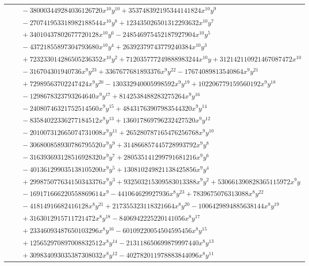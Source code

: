 \documentclass[11pt]{article}
\begin{document}
\begin{longtable}{@{}ll@{}}
 & $\quad -380003449284036126720x^{10}y^{10}+353748392195344141824x^{10}y^{9}$\\
 & $\quad -270741953318982188544x^{10}y^{8}+123435026501312293632x^{10}y^{7}$\\
 & $\quad +34010437802677720128x^{10}y^{6}-248546975452187927904x^{10}y^{5}$\\
 & $\quad -43721855897304793680x^{10}y^{4}+26392379743779240384x^{10}y^{3}$\\
 & $\quad +723233014286505236352x^{10}y^{2}+712035777249888983244x^{10}y+312142110921467087472x^{10}$\\
 & $\quad -316704301940736x^{9}y^{23}+3367677681893376x^{9}y^{22}-17674089813540864x^{9}y^{21}$\\
 & $\quad +72989563702247424x^{9}y^{20}-130332940005998592x^{9}y^{19}+102206779159560192x^{9}y^{18}$\\
 & $\quad -1298678323793264640x^{9}y^{17}+8142538488283275264x^{9}y^{16}$\\
 & $\quad -24080746321752514560x^{9}y^{15}+48431763907983544320x^{9}y^{14}$\\
 & $\quad -83584022336277184512x^{9}y^{13}+136017869796232427520x^{9}y^{12}$\\
 & $\quad -201007312665074731008x^{9}y^{11}+265280787165476256768x^{9}y^{10}$\\
 & $\quad -306800858930786795520x^{9}y^{9}+314866857445728993792x^{9}y^{8}$\\
 & $\quad -316393693128516928320x^{9}y^{7}+280535141299791681216x^{9}y^{6}$\\
 & $\quad -401361299035138105200x^{9}y^{5}+130810249821138425856x^{9}y^{4}$\\
 & $\quad +299875077634150343376x^{9}y^{3}+932503215309583013388x^{9}y^{2}+530661390828365115972x^{9}y$\\
 & $\quad -169171666220558869614x^{9}-441064629927936x^{8}y^{23}+7839675076313088x^{8}y^{22}$\\
 & $\quad -41814916682416128x^{8}y^{21}+217355323118321664x^{8}y^{20}-1006429894885638144x^{8}y^{19}$\\
 & $\quad +3163012915711721472x^{8}y^{18}-8406942225220141056x^{8}y^{17}$\\
 & $\quad +23346093487650103296x^{8}y^{16}-60109220054504595456x^{8}y^{15}$\\
 & $\quad +125652970897008832512x^{8}y^{14}-213118650699879997440x^{8}y^{13}$\\
 & $\quad +309834093035387308032x^{8}y^{12}-402782011978883844096x^{8}y^{11}$\\

\end{longtable}
\end{document}
